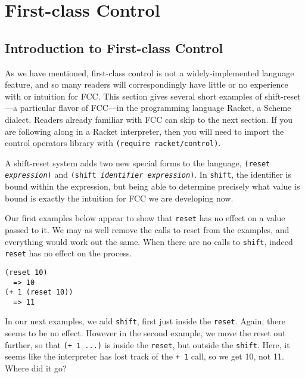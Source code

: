 \documentclass[11pt]{article}
\newcommand{\maybePage}{\newpage}
\begin{document}
%


\maybePage
\section{First-class Control}
\label{sec:FCC}

\subsection{Introduction to First-class Control}
\label{subsec:intro-to-fcc}

As we have mentioned, first-class control is not a widely-implemented language feature, and so many readers will correspondingly have little or no experience with or intuition for FCC.
This section gives several short examples of shift-reset---a particular flavor of FCC---in the programming language Racket, a Scheme dialect.
Readers already familiar with FCC can skip to the next section.
If you are following along in a Racket interpreter, then you will need to import the control operators library with \texttt{(require racket/control)}.

A shift-reset system adds two new special forms to the language, \texttt{(reset \textit{expression})} and \texttt{(shift \textit{identifier expression})}.
In \texttt{shift}, the identifier is bound within the expression, but being able to determine precisely what value is bound is exactly the intuition for FCC we are developing now.

Our first examples below appear to show that \texttt{reset} has no effect on a value passed to it.
We may as well remove the calls to reset from the examples, and everything would work out the same.
When there are no calls to \texttt{shift}, indeed \texttt{reset} has no effect on the process.

\begin{verbatim}
(reset 10)
  => 10
(+ 1 (reset 10))
  => 11
\end{verbatim}

In our next examples, we add \texttt{shift}, first just inside the \texttt{reset}.
Again, there seems to be no effect.
However in the second example, we move the reset out further, so that \texttt{(+ 1 ...)} is inside the \texttt{reset}, but outside the \texttt{shift}.
Here, it seems like the interpreter has lost track of the \texttt{+ 1} call, so we get 10, not 11.
Where did it go?
\end{document}

